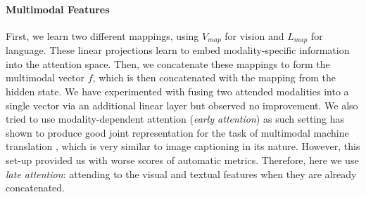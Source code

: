 \documentclass[11pt,a4paper]{article}
\begin{document}
\paragraph{Multimodal Features}
First, we learn two different mappings, using $V_{map}$ for vision and $L_{map}$ for language.
These linear projections learn to embed modality-specific information into the attention space.
Then, we concatenate these mappings to form the multimodal vector $f$, which is then concatenated with the mapping from the hidden state.
We have experimented with fusing two attended modalities into a single vector via an additional linear layer but observed no improvement.
We also tried to use modality-dependent attention (\textit{early attention}) as such setting has shown to produce good joint representation for the task of multimodal machine translation \cite{Caglayan2016,Caglayan2019}, which is very similar to image captioning in its nature.
However, this set-up provided us with worse scores of automatic metrics.
Therefore, here we use \textit{late attention}: attending to the visual and textual features when they are already concatenated.
\end{document}
